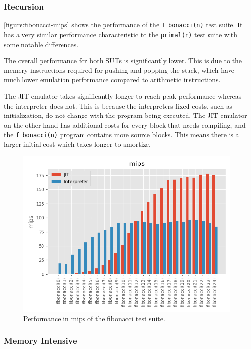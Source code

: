 \subsubsection{Recursion}

\autoref{figure:fibonacci-mips} shows the performance of the \texttt{fibonacci(n)} test suite. It has a very similar performance characteristic to the \texttt{primal(n)} test suite with some notable differences.

The overall performance for both SUTs is significantly lower. This is due to the memory instructions required for pushing and popping the stack, which have much lower emulation performance compared to arithmetic instructions.

The JIT emulator takes significantly longer to reach peak performance whereas the interpreter does not. This is because the interpreters fixed costs, such as initialization, do not change with the program being executed. The JIT emulator on the other hand has additional costs for every block that needs compiling, and the \texttt{fibonacci(n)} program contains more source blocks. This means there is a larger initial cost which takes longer to amortize.

\begin{figure}
    \centering
    \includegraphics{output/graphs/tests/fibonacci/mips.png}
    \caption{Performance in mips of the fibonacci test suite.}
    \label{figure:fibonacci-mips}
\end{figure}

\subsubsection{Memory Intensive}

